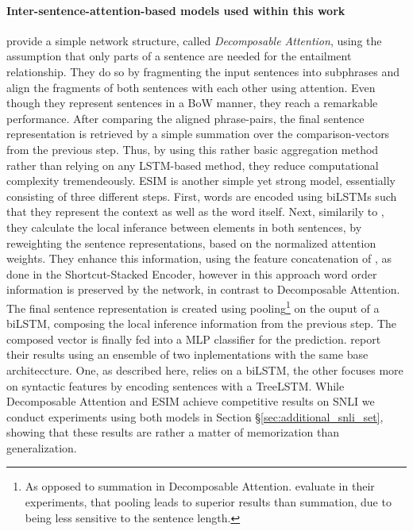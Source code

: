 \paragraph*{Inter-sentence-attention-based models used within this work}
\cite{parikh2016decomposable} provide a simple network structure, called \textit{Decomposable Attention}, using the assumption that only parts of a sentence are needed for the entailment relationship. They do so by fragmenting the input sentences into subphrases and align the fragments of both sentences with each other using attention. Even though they represent sentences in a \ac{BoW} manner, they reach a remarkable performance. After comparing the aligned phrase-pairs, the final sentence representation is retrieved by a simple summation over the comparison-vectors from the previous step. Thus, by using this rather basic aggregation method rather than relying on any \ac{LSTM}-based method, they reduce computational complexity tremendeously. \ac{ESIM} \citep{chen2017enhanced} is another simple yet strong model, essentially consisting of three different steps. First, words are encoded using \ac{biLSTM}s such that they represent the context as well as the word itself. Next, similarily to \cite{parikh2016decomposable}, they calculate the local inferance between elements in both sentences, by reweighting the sentence representations, based on the normalized attention weights. They enhance this information, using the feature concatenation of \cite{mou2015natural}, as done in the Shortcut-Stacked Encoder, however in this approach word order information is preserved by the network, in contrast to Decomposable Attention. The final sentence representation is created using pooling\footnote{As opposed to summation in Decomposable Attention. \cite{chen2017enhanced} evaluate in their experiments, that pooling leads to superior results than summation, due to being less sensitive to the sentence length.} on the ouput of a \ac{biLSTM}, composing the local inference information from the previous step. The composed vector is finally fed into a \ac{MLP} classifier for the prediction. \cite{chen2017enhanced} report their results using an ensemble of two inplementations with the same base architeccture. One, as described here, relies on a \ac{biLSTM}, the other focuses more on syntactic features by encoding sentences with a TreeLSTM. While Decomposable Attention and ESIM achieve competitive results on \ac{SNLI} we conduct experiments using both models in Section §\ref{sec:additional_snli_set}, showing that these results are rather a matter of memorization than generalization.

